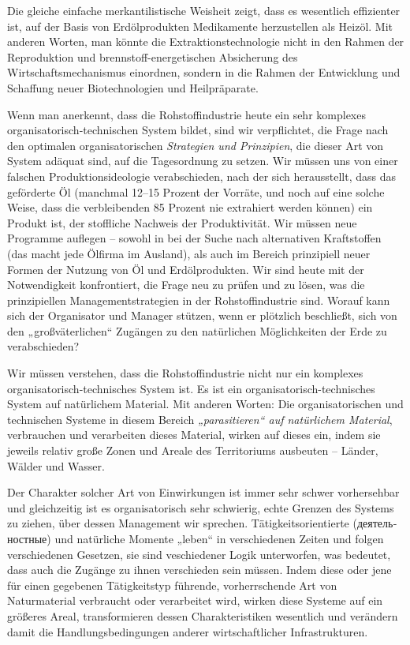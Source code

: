 \documentclass[11pt,a4paper]{article}
\begin{document}
Die gleiche einfache merkantilistische Weisheit zeigt, dass es wesentlich
effizienter ist, auf der Basis von Erdölprodukten Medikamente herzustellen als
Heizöl. Mit anderen Worten, man könnte die Extraktionstechnologie nicht in den
Rahmen der Reproduktion und brennstoff-energetischen Absicherung des
Wirtschaftsmechanismus einordnen, sondern in die Rahmen der Entwicklung und
Schaffung neuer Biotechnologien und Heilpräparate.

Wenn man anerkennt, dass die Rohstoffindustrie heute ein sehr komplexes
organisatorisch-technischen System bildet, sind wir verpflichtet, die Frage
nach den optimalen organisatorischen \emph{Strategien und Prinzipien}, die
dieser Art von System adäquat sind, auf die Tagesordnung zu setzen. Wir müssen
uns von einer falschen Produktionsideologie verabschieden, nach der sich
herausstellt, dass das geförderte Öl (manchmal 12--15 Prozent der Vorräte, und
noch auf eine solche Weise, dass die verbleibenden 85 Prozent nie extrahiert
werden können) ein Produkt ist, der stoffliche Nachweis der Produktivität.
Wir müssen neue Programme auflegen -- sowohl in bei der Suche nach
alternativen Kraftstoffen (das macht jede Ölfirma im Ausland), als auch im
Bereich prinzipiell neuer Formen der Nutzung von Öl und Erdölprodukten.  Wir
sind heute mit der Notwendigkeit konfrontiert, die Frage neu zu prüfen und zu
lösen, was die prinzipiellen Managementstrategien in der Rohstoffindustrie
sind.  Worauf kann sich der Organisator und Manager stützen, wenn er plötzlich
beschließt, sich von den „großväterlichen“ Zugängen zu den natürlichen
Möglichkeiten der Erde zu verabschieden?

Wir müssen verstehen, dass die Rohstoffindustrie nicht nur ein komplexes
organisatorisch-technisches System ist. Es ist ein organisatorisch-technisches
System auf natürlichem Material. Mit anderen Worten: Die organisatorischen und
technischen Systeme in diesem Bereich \emph{„parasitieren“ auf natürlichem
  Material}, verbrauchen und verarbeiten dieses Material, wirken auf dieses
ein, indem sie jeweils relativ große Zonen und Areale des Territoriums
ausbeuten -- Länder, Wälder und Wasser.

Der Charakter solcher Art von Einwirkungen ist immer sehr schwer vorhersehbar
und gleichzeitig ist es organisatorisch sehr schwierig, echte Grenzen des
Systems zu ziehen, über dessen Management wir sprechen. Tätigkeitsorientierte
(\foreignlanguage{russian}{деятельностные}) und natürliche Momente „leben“ in
verschiedenen Zeiten und folgen verschiedenen Gesetzen, sie sind veschiedener
Logik unterworfen, was bedeutet, dass auch die Zugänge zu ihnen verschieden
sein müssen. Indem diese oder jene für einen gegebenen Tätigkeitstyp führende,
vorherrschende Art von Naturmaterial verbraucht oder verarbeitet wird, wirken
diese Systeme auf ein größeres Areal, transformieren dessen Charakteristiken
wesentlich und verändern damit die Handlungsbedingungen anderer
wirtschaftlicher Infrastrukturen. 
\end{document}
